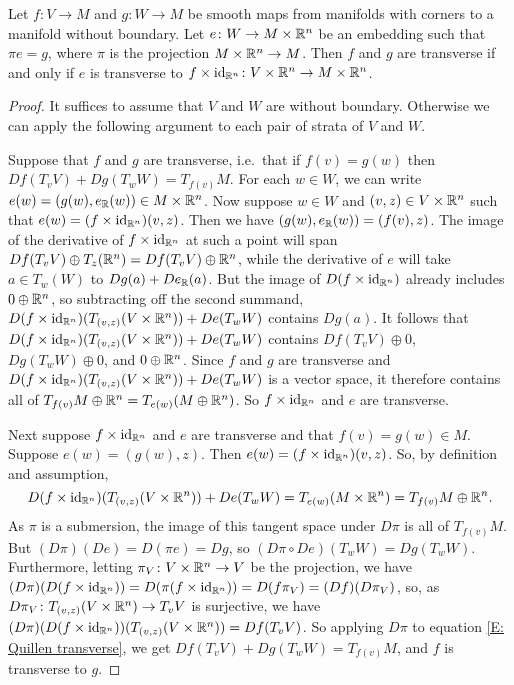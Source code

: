 \begin{lemma}\label{L: all transversality is wrt embeddings}
	Let $f \colon V \to M$ and $g \colon W \to M$ be smooth maps from manifolds with corners to a manifold without boundary.
	Let $e \colon W \to M \times \mathbb{R}^n$ be an embedding such that $\pi e = g$, where $\pi$ is the projection $M \times \mathbb{R}^n \to M$.
	Then $f$ and $g$ are transverse if and only if $e$ is transverse to $f \times \mathrm{id}_{\mathbb{R}^n} \colon V \times \mathbb{R}^n \to M \times \mathbb{R}^n$.
\end{lemma}
\begin{proof}
	It suffices to assume that $V$ and $W$ are without boundary.
	Otherwise we can apply the following argument to each pair of strata of $V$ and $W$.

	Suppose that $f$ and $g$ are transverse, i.e.\ that if $f(v) = g(w)$ then $Df(T_vV)+Dg(T_wW) = T_{f(v)}M$.
	For each $w \in W$, we can write $e(w) = (g(w),e_{\mathbb{R}}(w)) \in M \times \mathbb{R}^n$.
	Now suppose $w \in W$ and $(v,z) \in V \times \mathbb{R}^n$ such that $e(w) = (f \times \mathrm{id}_{\mathbb{R}^n})(v,z)$.
	Then we have $(g(w),e_{\mathbb{R}}(w)) = (f(v),z)$.
	The image of the derivative of $f \times \mathrm{id}_{\mathbb{R}^n}$ at such a point will span $Df(T_vV) \oplus T_z(\mathbb{R}^{n}) = Df(T_vV) \oplus \mathbb{R}^{n}$, while the derivative of $e$ will take $a \in T_w(W)$ to $Dg(a)+ De_{\mathbb{R}}(a)$.
	But the image of $D(f \times \mathrm{id}_{\mathbb{R}^n})$ already includes $0 \oplus \mathbb{R}^{n}$, so subtracting off the second summand, $D(f \times \mathrm{id}_{\mathbb{R}^{n}})(T_{(v,z)}(V \times \mathbb{R}^n))+De(T_wW)$ contains $Dg(a)$.
	It follows that $D(f \times \mathrm{id}_{\mathbb{R}^{n}})(T_{(v,z)}(V \times \mathbb{R}^n))+De(T_wW)$ contains $Df(T_vV) \oplus 0$, $Dg(T_wW) \oplus 0$, and $0 \oplus \mathbb{R}^n$.
	Since $f$ and $g$ are transverse and $D(f \times \mathrm{id}_{\mathbb{R}^{n}})(T_{(v,z)}(V \times \mathbb{R}^n))+De(T_wW)$ is a vector space, it therefore contains all of $T_{f(v)}M \oplus \mathbb{R}^n = T_{e(w)}(M \oplus \mathbb{R}^n)$.
	So $f \times \mathrm{id}_{\mathbb{R}^n}$ and $e$ are transverse.

	Next suppose $f \times \mathrm{id}_{\mathbb{R}^n}$ and $e$ are transverse and that $f(v) = g(w) \in M$.
	Suppose $e(w) = (g(w),z)$.
	Then $e(w) = (f \times \mathrm{id}_{\mathbb{R}^n})(v,z)$.
	So, by definition and assumption,
	\begin{equation}\label{E: Quillen transverse}
		D(f \times \mathrm{id}_{\mathbb{R}^{n}})(T_{(v,z)}(V \times \mathbb{R}^n))+De(T_wW) = T_{e(w)}(M \times \mathbb{R}^n) = T_{f(v)}M \oplus \mathbb{R}^n.
	\end{equation}
	As $\pi$ is a submersion, the image of this tangent space under $D\pi$ is all of $T_{f(v)}M$.
	But $(D\pi)(De) = D(\pi e) = Dg$, so $(D\pi \circ De)(T_wW) = Dg(T_wW)$.
	Furthermore, letting $\pi_V \colon V \times \mathbb{R}^n \to V$ be the projection, we have $(D\pi)(D(f \times \mathrm{id}_{\mathbb{R}^{n}})) = D(\pi(f \times \mathrm{id}_{\mathbb{R}^{n}})) = D(f\pi_V) = (Df)(D\pi_V)$, so, as $D\pi_V \colon T_{(v,z)}(V \times \mathbb{R}^n) \to T_vV$ is surjective, we have $(D\pi)(D(f \times \mathrm{id}_{\mathbb{R}^{n}}))(T_{(v,z)}(V \times \mathbb{R}^n)) = Df(T_vV)$.
	So applying $D\pi$ to equation \eqref{E: Quillen transverse}, we get $Df(T_vV)+Dg(T_wW) = T_{f(v)}M$, and $f$ is transverse to $g$.
\end{proof}

